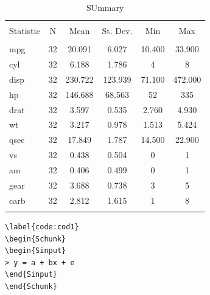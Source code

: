 \documentclass{article}
\begin{document}
\begin{table}[!htbp] \centering 
  \caption{SUmmary} 
  \label{tab:tabella} 
\begin{tabular}{@{\extracolsep{5pt}}lccccc} 
\\[-1.8ex]\hline 
\hline \\[-1.8ex] 
Statistic & \multicolumn{1}{c}{N} & \multicolumn{1}{c}{Mean} & \multicolumn{1}{c}{St. Dev.} & \multicolumn{1}{c}{Min} & \multicolumn{1}{c}{Max} \\ 
\hline \\[-1.8ex] 
mpg & 32 & 20.091 & 6.027 & 10.400 & 33.900 \\ 
cyl & 32 & 6.188 & 1.786 & 4 & 8 \\ 
disp & 32 & 230.722 & 123.939 & 71.100 & 472.000 \\ 
hp & 32 & 146.688 & 68.563 & 52 & 335 \\ 
drat & 32 & 3.597 & 0.535 & 2.760 & 4.930 \\ 
wt & 32 & 3.217 & 0.978 & 1.513 & 5.424 \\ 
qsec & 32 & 17.849 & 1.787 & 14.500 & 22.900 \\ 
vs & 32 & 0.438 & 0.504 & 0 & 1 \\ 
am & 32 & 0.406 & 0.499 & 0 & 1 \\ 
gear & 32 & 3.688 & 0.738 & 3 & 5 \\ 
carb & 32 & 2.812 & 1.615 & 1 & 8 \\ 
\hline \\[-1.8ex] 
\end{tabular} 
\end{table} 
\begin{verbatim}\label{code:cod1}
\begin{Schunk}
\begin{Sinput}
> y = a + bx + e
\end{Sinput}
\end{Schunk}

\end{verbatim}
\end{document}
